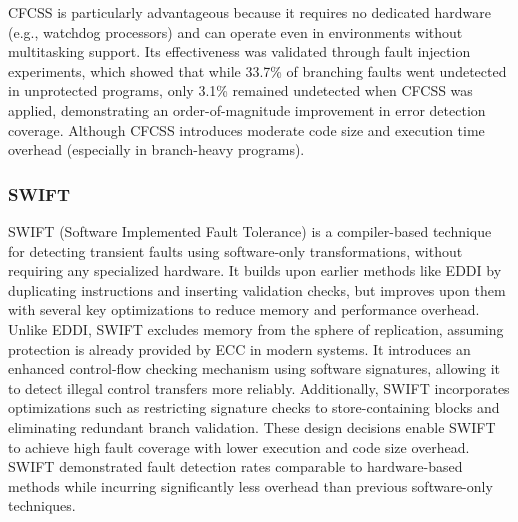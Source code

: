 CFCSS is particularly advantageous because it requires no dedicated hardware (e.g., watchdog processors) and can operate even in environments without multitasking support. Its effectiveness was validated through fault injection experiments, which showed that while 33.7\% of branching faults went undetected in unprotected programs, only 3.1\% remained undetected when CFCSS was applied, demonstrating an order-of-magnitude improvement in error detection coverage. Although CFCSS introduces moderate code size and execution time overhead (especially in branch-heavy programs).

\subsubsection{SWIFT}

SWIFT \cite{swift} (Software Implemented Fault Tolerance) is a compiler-based technique for detecting transient faults using software-only transformations, without requiring any specialized hardware. It builds upon earlier methods like EDDI by duplicating instructions and inserting validation checks, but improves upon them with several key optimizations to reduce memory and performance overhead. Unlike EDDI, SWIFT excludes memory from the sphere of replication, assuming protection is already provided by ECC in modern systems. It introduces an enhanced control-flow checking mechanism using software signatures, allowing it to detect illegal control transfers more reliably. Additionally, SWIFT incorporates optimizations such as restricting signature checks to store-containing blocks and eliminating redundant branch validation. These design decisions enable SWIFT to achieve high fault coverage with lower execution and code size overhead. SWIFT demonstrated fault detection rates comparable to hardware-based methods while incurring significantly less overhead than previous software-only techniques.